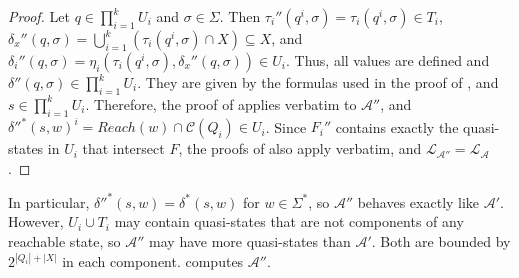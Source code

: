 \begin{proof}
  Let $q \in \prod_{i=1}^k U_i$ and $\sigma \in \Sigma$. Then $\tau_i''(q^i, \sigma) =
  \tau_i(q^i, \sigma) \in T_i$, $\delta_x''(q, \sigma) = \bigcup_{i=1}^k (\tau_i(q^i,
  \sigma) \cap X) \subseteq X$, and $\delta_i''(q, \sigma) = \eta_i(\tau_i(q^i, \sigma),
  \delta_x''(q, \sigma)) \in U_i$. Thus, all values are defined and $\delta''(q, \sigma)
  \in \prod_{i=1}^k U_i$. They are given by the formulas used in the proof of
  , and $s \in \prod_{i=1}^k U_i$. Therefore, the proof of
   applies verbatim to $\mathcal{A}''$, and $\delta''^*(s,
  w)^i = Reach(w) \cap \mathcal{C}(Q_i) \in U_i$. Since $F_i''$ contains exactly the
  quasi-states in $U_i$ that intersect $F$, the proofs of
   also apply verbatim,
  and $\mathcal{L}_{\mathcal{A}''} = \mathcal{L}_\mathcal{A}$.
\end{proof}

In particular, $\delta''^*(s, w) = \delta^*(s, w)$ for $w \in \Sigma^*$, so
$\mathcal{A}''$ behaves exactly like $\mathcal{A}'$. However, $U_i \cup T_i$ may contain
quasi-states that are not components of any reachable state, so $\mathcal{A}''$ may have
more quasi-states than $\mathcal{A}'$. Both are bounded by $2^{|Q_i| + |X|}$ in each
component.  computes $\mathcal{A}''$.

